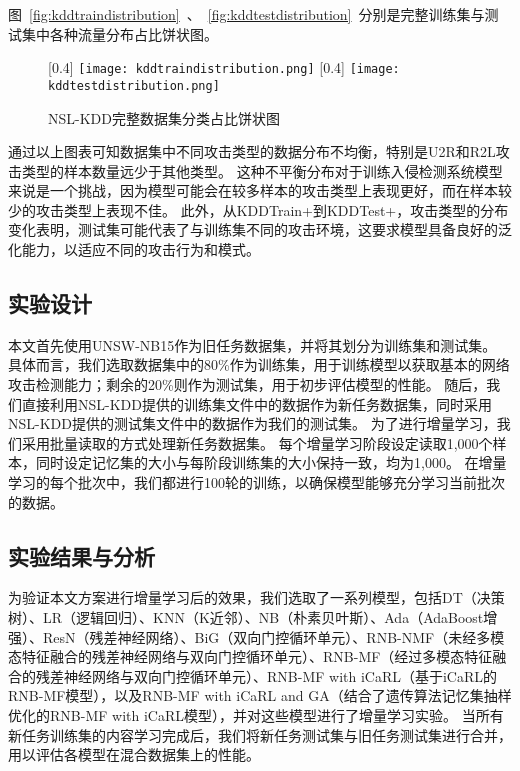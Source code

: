 图~\ref{fig:kddtraindistribution}~、~\ref{fig:kddtestdistribution}~分别是完整训练集与测试集中各种流量分布占比饼状图。
\begin{figure}[htbp]
  \centering
  [0.4\textwidth]{
  \texttt{[image: kddtraindistribution.png]}
  }
  \hspace{36pt}
  [0.4\textwidth]{
  \texttt{[image: kddtestdistribution.png]}
  }
  \caption{NSL-KDD完整数据集分类占比饼状图}
\end{figure}

通过以上图表可知数据集中不同攻击类型的数据分布不均衡，特别是U2R和R2L攻击类型的样本数量远少于其他类型。
这种不平衡分布对于训练入侵检测系统模型来说是一个挑战，因为模型可能会在较多样本的攻击类型上表现更好，而在样本较少的攻击类型上表现不佳。
此外，从KDDTrain+到KDDTest+，攻击类型的分布变化表明，测试集可能代表了与训练集不同的攻击环境，这要求模型具备良好的泛化能力，以适应不同的攻击行为和模式。

\subsection{实验设计}

本文首先使用UNSW-NB15作为旧任务数据集，并将其划分为训练集和测试集。
具体而言，我们选取数据集中的80\%作为训练集，用于训练模型以获取基本的网络攻击检测能力；剩余的20\%则作为测试集，用于初步评估模型的性能。
随后，我们直接利用NSL-KDD提供的训练集文件中的数据作为新任务数据集，同时采用NSL-KDD提供的测试集文件中的数据作为我们的测试集。
为了进行增量学习，我们采用批量读取的方式处理新任务数据集。
每个增量学习阶段设定读取1,000个样本，同时设定记忆集的大小与每阶段训练集的大小保持一致，均为1,000。
在增量学习的每个批次中，我们都进行100轮的训练，以确保模型能够充分学习当前批次的数据。
\subsection{实验结果与分析}
为验证本文方案进行增量学习后的效果，我们选取了一系列模型，包括DT（决策树）、LR（逻辑回归）、KNN（K近邻）、NB（朴素贝叶斯）、Ada（AdaBoost增强）、ResN（残差神经网络）、BiG（双向门控循环单元）、RNB-NMF（未经多模态特征融合的残差神经网络与双向门控循环单元）、RNB-MF（经过多模态特征融合的残差神经网络与双向门控循环单元）、RNB-MF with iCaRL（基于iCaRL的RNB-MF模型），以及RNB-MF with iCaRL and GA（结合了遗传算法记忆集抽样优化的RNB-MF with iCaRL模型），并对这些模型进行了增量学习实验。
当所有新任务训练集的内容学习完成后，我们将新任务测试集与旧任务测试集进行合并，用以评估各模型在混合数据集上的性能。\par

